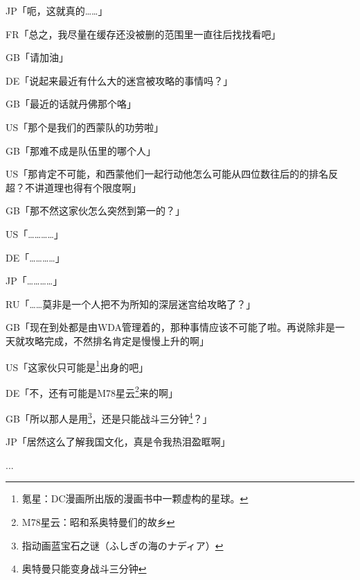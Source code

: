 JP「呃，这就真的……」

FR「总之，我尽量在缓存还没被删的范围里一直往后找找看吧」

GB「请加油」

DE「说起来最近有什么大的迷宫被攻略的事情吗？」

GB「最近的话就丹佛那个咯」

US「那个是我们的西蒙队的功劳啦」

GB「那难不成是队伍里的哪个人」

US「那肯定不可能，和西蒙他们一起行动他怎么可能从四位数往后的的排名反超？不讲道理也得有个限度啊」

GB「那不然这家伙怎么突然到第一的？」

US「…………」

DE「…………」

JP「…………」

RU「……莫非是一个人把不为所知的深层迷宫给攻略了？」

GB「现在到处都是由WDA管理着的，那种事情应该不可能了啦。再说除非是一天就攻略完成，不然排名肯定是慢慢上升的啊」

US「这家伙只可能是\footnote{氪星：DC漫画所出版的漫画书中一颗虚构的星球。}出身的吧」

DE「不，还有可能是M78星云\footnote{M78星云：昭和系奥特曼们的故乡}来的啊」

GB「所以那人是用\footnote{指动画蓝宝石之谜（ふしぎの海のナディア）}，还是只能战斗三分钟\footnote{奥特曼只能变身战斗三分钟}？」

JP「居然这么了解我国文化，真是令我热泪盈眶啊」

...

